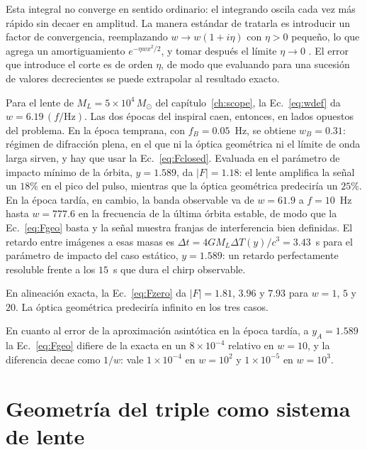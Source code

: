 \documentclass[11pt,a4paper,openany]{book}
\newcommand{\Msun}{M_{\odot}}
\begin{document}
Esta integral no converge en sentido ordinario: el integrando oscila cada vez
m\'as r\'apido sin decaer en amplitud. La manera est\'andar de tratarla es
introducir un factor de convergencia, reemplazando $w\to w(1+i\eta)$ con
$\eta>0$ peque\~no, lo que agrega un amortiguamiento $e^{-\eta wx^{2}/2}$, y
tomar despu\'es el l\'imite $\eta\to0$ \citep{UlmerGoodman1995}. El error que
introduce el corte es de orden $\eta$, de modo que evaluando para una sucesi\'on
de valores decrecientes se puede extrapolar al resultado exacto.

\begin{ejemplo}[title={Los dos reg\'imenes del sistema concreto}]
Para el lente de $M_L=5\times10^{4}\,\Msun$ del
cap\'itulo~\ref{ch:scope}, la Ec.~\eqref{eq:wdef} da
$w=6.19\,(f/\mathrm{Hz})$. Las dos \'epocas del inspiral caen, entonces, en
lados opuestos del problema. En la \'epoca temprana, con $f_B=0.05$~Hz, se
obtiene $w_B=0.31$: r\'egimen de difracci\'on plena, en el que ni la
\'optica geom\'etrica ni el l\'imite de onda larga sirven, y hay que usar la
Ec.~\eqref{eq:Fclosed}. Evaluada en el par\'ametro de impacto m\'inimo de la
\'orbita, $y=1.589$, da $|F|=1.18$: el lente amplifica la se\~nal un $18\%$ en
el pico del pulso, mientras que la \'optica geom\'etrica predecir\'ia un
$25\%$. En la \'epoca tard\'ia, en cambio, la banda
observable va de $w=61.9$ a $f=10$~Hz hasta $w=777.6$ en la frecuencia de la
\'ultima \'orbita estable, de modo que la Ec.~\eqref{eq:Fgeo} basta y la
se\~nal muestra franjas de interferencia bien definidas. El retardo entre
im\'agenes a esas masas es $\Delta t=4GM_L\Delta T(y)/c^{3}=3.43$~s para el
par\'ametro de impacto del caso est\'atico, $y=1.589$: un retardo
perfectamente resoluble frente a los $15$~s que dura el chirp observable.

En alineaci\'on exacta, la Ec.~\eqref{eq:Fzero} da $|F|=1.81$, $3.96$ y
$7.93$ para $w=1$, $5$ y $20$. La \'optica geom\'etrica predecir\'ia infinito
en los tres casos.

En cuanto al error de la aproximaci\'on asint\'otica en la \'epoca tard\'ia,
a $y_A=1.589$ la Ec.~\eqref{eq:Fgeo} difiere de la exacta en un
$8\times10^{-4}$ relativo en $w=10$, y la diferencia decae como $1/w$: vale
$1\times10^{-4}$ en $w=10^{2}$ y $1\times10^{-5}$ en $w=10^{3}$.
\end{ejemplo}

\chapter{Geometr\'ia del triple como sistema de lente}
\label{ch:geometry}
\end{document}
